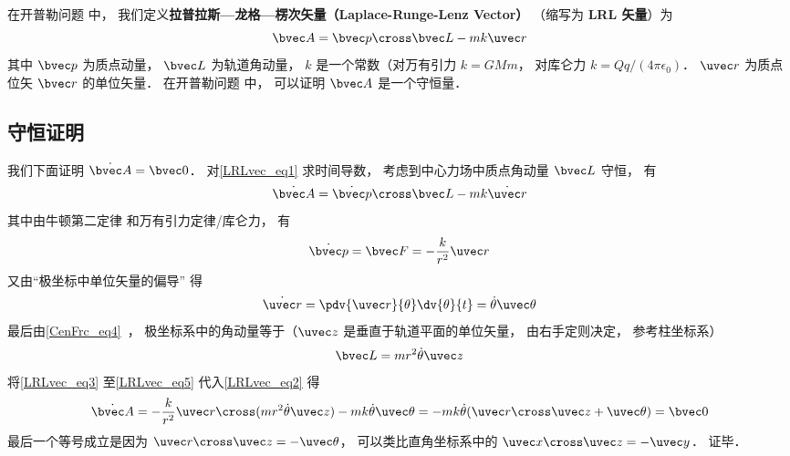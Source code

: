 

在开普勒问题%
中， 我们定义\textbf{拉普拉斯—龙格—楞次矢量（Laplace-Runge-Lenz Vector）} （缩写为 \textbf{LRL 矢量}）为
\begin{equation}\label{LRLvec_eq1}
\bvec A = \bvec p \cross \bvec L - mk \uvec r
\end{equation}
其中 $\bvec p$ 为质点动量， $\bvec L$ 为轨道角动量， $k$ 是一个常数（对万有引力 $k = GMm$， 对库仑力 $k = Qq/(4\pi\epsilon_0)$． $\uvec r$ 为质点位矢 $\bvec r$ 的单位矢量． 在开普勒问题%
中， 可以证明 $\bvec A$ 是一个守恒量．

\subsection{守恒证明}
我们下面证明 $\dot{\bvec A} = \bvec 0$． 对\autoref{LRLvec_eq1} 求时间导数， 考虑到中心力场中质点角动量 $\bvec L$ 守恒， 有
\begin{equation}\label{LRLvec_eq2}
\dot{\bvec A} = \dot{\bvec p}\cross \bvec L  - mk\dot{\uvec r}
\end{equation}
其中由牛顿第二定律 和万有引力定律/库仑力， 有
\begin{equation}\label{LRLvec_eq3}
\dot{\bvec p} = \bvec F = - \frac{k}{r^2}\uvec r
\end{equation}
又由“极坐标中单位矢量的偏导” 得
\begin{equation}\label{LRLvec_eq4}
\dot{\uvec r} = \pdv{\uvec r}{\theta} \dv{\theta}{t} = \dot\theta\uvec \theta
\end{equation}
最后由\autoref{CenFrc_eq4}~， 极坐标系中的角动量等于（$\uvec z$ 是垂直于轨道平面的单位矢量， 由右手定则决定， 参考柱坐标系）
\begin{equation}\label{LRLvec_eq5}
\bvec L = mr^2\dot \theta \uvec z
\end{equation}
将\autoref{LRLvec_eq3} 至\autoref{LRLvec_eq5} 代入\autoref{LRLvec_eq2} 得
\begin{equation}
\dot{\bvec A} = -\frac{k}{r^2}\uvec r \cross (mr^2\dot\theta\uvec z) - mk\dot\theta\uvec\theta
=-mk\dot\theta (\uvec r\cross \uvec z + \uvec \theta)
= \bvec 0
\end{equation}
最后一个等号成立是因为 $\uvec r\cross\uvec z = -\uvec\theta$， 可以类比直角坐标系中的 $\uvec x\cross\uvec z = -\uvec y$． 证毕．


